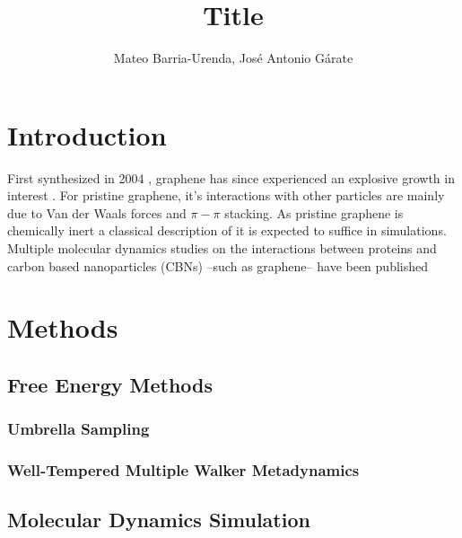 \documentclass[twoside,twocolumn,9pt]{article}
\author{Mateo Barria-Urenda, José Antonio Gárate}
\title{Title}
\date{}
\begin{document}
\maketitle

\abstract{}

\section{Introduction}


First synthesized in 2004 \cite{Novoselov_2004}, graphene has since
experienced an explosive growth in interest \cite{Randviir_2014}.  For
pristine graphene, it's interactions with other particles are mainly
due to Van der Waals forces and $\pi-\pi$ stacking. \cite{Zuo_2012} As
pristine graphene is chemically inert \cite{Eftekhari_2017} a
classical description of it is expected to suffice in simulations.
Multiple molecular dynamics studies on the interactions between
proteins and carbon based nanoparticles (CBNs) --such as graphene--
have been published \cite{Zheng_2003, Ge_2011, Zuo_2012, Chong_2015,
  Duan_2015, Shityakov_2015, Al_Qattan_2018,Puigpelat_2019,
  Gonz_lez_Durruthy_2020, Li_2020}





\section{Methods}

\subsection{Free Energy Methods}

\subsubsection{Umbrella Sampling}

\subsubsection{Well-Tempered Multiple Walker Metadynamics}

\subsection{Molecular Dynamics Simulation}
\end{document}
